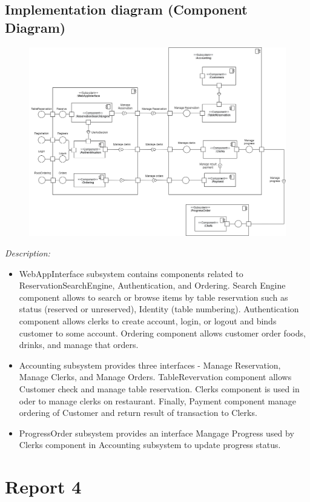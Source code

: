 \documentclass[11pt]{article}
\begin{document}
    \subsection{Implementation diagram (Component Diagram)}
    \begin{figure}[!h]
        \centering
        \includegraphics[width=17cm]{ComponentDiagram.png}
    \end{figure}
    \textit{Description:}
    \begin{itemize}
        \item WebAppInterface subsystem contains components related to ReservationSearchEngine, Authentication, and Ordering. Search Engine component allows to search or browse items by table reservation such as status (reserved or unreserved), Identity (table numbering). Authentication component allows clerks to create account, login, or logout and binds customer to some account. Ordering component allows customer order foods, drinks, and manage that orders.
        \item Accounting subsystem provides three interfaces - Manage Reservation, Manage Clerks, and Manage Orders. TableRevervation component allows Customer check and manage table reservation. Clerks component is used in oder to manage clerks on restaurant. Finally, Payment component manage ordering of Customer and return result of transaction to Clerks.
        \item ProgressOrder subsystem provides an interface Mangage Progress used by Clerks component in Accounting subsystem to update progress status.
    \end{itemize}
    
\newpage
\section{Report 4}
    \subsection{}
\end{document}
